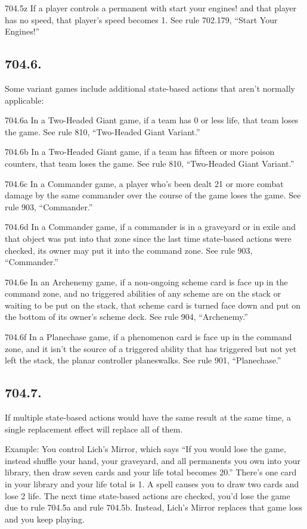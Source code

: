 704.5z If a player controls a permanent with start your engines! and that player has no speed, that player’s speed becomes 1. See rule 702.179, “Start Your Engines!”

\subsection*{704.6.}
Some variant games include additional state-based actions that aren’t normally applicable:

704.6a In a Two-Headed Giant game, if a team has 0 or less life, that team loses the game. See rule 810, “Two-Headed Giant Variant.”

704.6b In a Two-Headed Giant game, if a team has fifteen or more poison counters, that team loses the game. See rule 810, “Two-Headed Giant Variant.”

704.6c In a Commander game, a player who’s been dealt 21 or more combat damage by the same commander over the course of the game loses the game. See rule 903, “Commander.”

704.6d In a Commander game, if a commander is in a graveyard or in exile and that object was put into that zone since the last time state-based actions were checked, its owner may put it into the command zone. See rule 903, “Commander.”

704.6e In an Archenemy game, if a non-ongoing scheme card is face up in the command zone, and no triggered abilities of any scheme are on the stack or waiting to be put on the stack, that scheme card is turned face down and put on the bottom of its owner’s scheme deck. See rule 904, “Archenemy.”

704.6f In a Planechase game, if a phenomenon card is face up in the command zone, and it isn’t the source of a triggered ability that has triggered but not yet left the stack, the planar controller planeswalks. See rule 901, “Planechase.”

\subsection*{704.7.}
If multiple state-based actions would have the same result at the same time, a single replacement effect will replace all of them.

Example: You control Lich’s Mirror, which says “If you would lose the game, instead shuffle your hand, your graveyard, and all permanents you own into your library, then draw seven cards and your life total becomes 20.” There’s one card in your library and your life total is 1. A spell causes you to draw two cards and lose 2 life. The next time state-based actions are checked, you’d lose the game due to rule 704.5a and rule 704.5b. Instead, Lich’s Mirror replaces that game loss and you keep playing.

